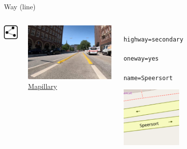 \documentclass{beamer}
\begin{document}
			\begin{frame}[fragile]{Way (line)}
				\begin{center}
					\begin{columns}
						\begin{column}{1cm}
							\centering
							\includegraphics[width=1cm]{images/240px-Mf_way.png}
						\end{column}
						\begin{column}{4.5cm}
							\centering
							\includegraphics[width=4.5cm]{images/way-example.jpg}
							\textcolor{gray}{
								\tiny
								\href{https://www.mapillary.com/app/?pKey=680503257254203}{Mapillary}
							}
						\end{column}
						\begin{column}{3.5cm}
							\begin{verbatim}
								highway=secondary
								oneway=yes
								name=Speersort
							\end{verbatim}
							\begin{center}
								\includegraphics[height=3cm]{images/secondary.png}
							\end{center}
						\end{column}
					\end{columns}
				\end{center}
			\end{frame}
			
\end{document}
